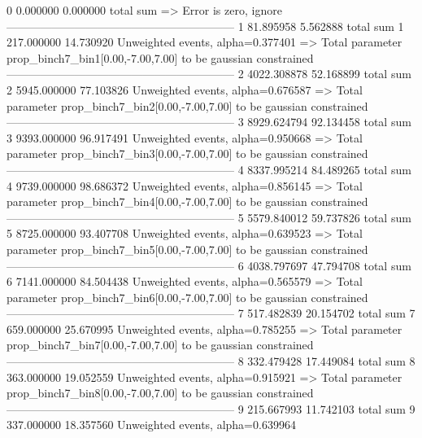 0          0.000000        0.000000        total sum                     
  => Error is zero, ignore      
------------------------------------------------------------
1          81.895958       5.562888        total sum                     
1          217.000000      14.730920       Unweighted events, alpha=0.377401
  => Total parameter prop_binch7_bin1[0.00,-7.00,7.00] to be gaussian constrained
------------------------------------------------------------
2          4022.308878     52.168899       total sum                     
2          5945.000000     77.103826       Unweighted events, alpha=0.676587
  => Total parameter prop_binch7_bin2[0.00,-7.00,7.00] to be gaussian constrained
------------------------------------------------------------
3          8929.624794     92.134458       total sum                     
3          9393.000000     96.917491       Unweighted events, alpha=0.950668
  => Total parameter prop_binch7_bin3[0.00,-7.00,7.00] to be gaussian constrained
------------------------------------------------------------
4          8337.995214     84.489265       total sum                     
4          9739.000000     98.686372       Unweighted events, alpha=0.856145
  => Total parameter prop_binch7_bin4[0.00,-7.00,7.00] to be gaussian constrained
------------------------------------------------------------
5          5579.840012     59.737826       total sum                     
5          8725.000000     93.407708       Unweighted events, alpha=0.639523
  => Total parameter prop_binch7_bin5[0.00,-7.00,7.00] to be gaussian constrained
------------------------------------------------------------
6          4038.797697     47.794708       total sum                     
6          7141.000000     84.504438       Unweighted events, alpha=0.565579
  => Total parameter prop_binch7_bin6[0.00,-7.00,7.00] to be gaussian constrained
------------------------------------------------------------
7          517.482839      20.154702       total sum                     
7          659.000000      25.670995       Unweighted events, alpha=0.785255
  => Total parameter prop_binch7_bin7[0.00,-7.00,7.00] to be gaussian constrained
------------------------------------------------------------
8          332.479428      17.449084       total sum                     
8          363.000000      19.052559       Unweighted events, alpha=0.915921
  => Total parameter prop_binch7_bin8[0.00,-7.00,7.00] to be gaussian constrained
------------------------------------------------------------
9          215.667993      11.742103       total sum                     
9          337.000000      18.357560       Unweighted events, alpha=0.639964
